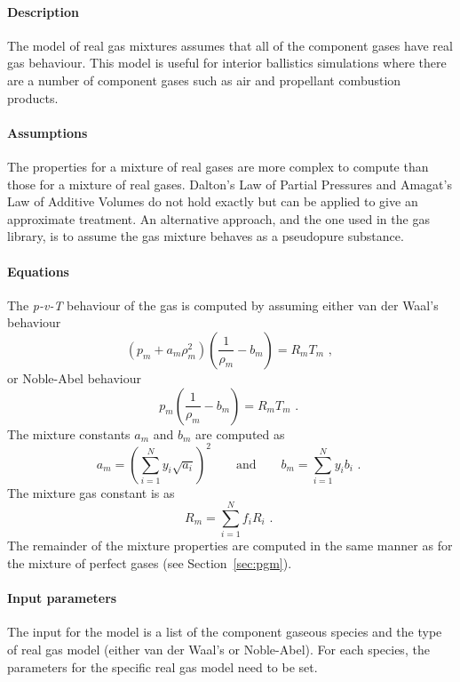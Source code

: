 \paragraph{Description}
The model of real gas mixtures assumes that all of the
component gases have real gas behaviour.
This model is useful for interior ballistics simulations
where there are a number of component gases such
as air and propellant combustion products.

\paragraph{Assumptions}
The properties for a mixture of real gases are more complex to compute
than those for a mixture of real gases.
Dalton's Law of Partial Pressures and Amagat's Law of Additive Volumes
do not hold exactly but can be applied to give an approximate
treatment.
An alternative approach, and the one used in the gas library,
is to assume the gas mixture behaves as a pseudopure substance.

\paragraph{Equations}
The \textit{p-v-T} behaviour of the gas is computed by assuming
either van der Waal's behaviour
\begin{equation}
  \left ( p_m + a_m\rho_m^2 \right ) \left ( \frac{1}{\rho_m} - b_m \right ) = R_mT_m \text{ , }
\end{equation}
or Noble-Abel behaviour
\begin{equation}
  p_m \left( \frac{1}{\rho_m} - b_m \right ) = R_mT_m \text{ . }
\end{equation}
The mixture constants $a_m$ and $b_m$ are computed as
\begin{equation}
  a_m = \left( \sum_{i=1}^N y_i \sqrt{a_i} \right)^2 \qquad \text{and} \qquad 
  b_m = \sum_{i=1}^N y_i b_i \text{ . }
\end{equation}
The mixture gas constant is as 
\begin{equation}
R_m = \sum_{i=1}^N f_i R_i \text{ . }
\end{equation}
The remainder of the mixture properties are computed in
the same manner as for the mixture of perfect gases (see Section~\ref{sec:pgm}).


\paragraph{Input parameters}
The input for the model is a list of the component gaseous species and
the type of real gas model (either van der Waal's or Noble-Abel).
For each species, the parameters for the specific real gas model need to be set.

